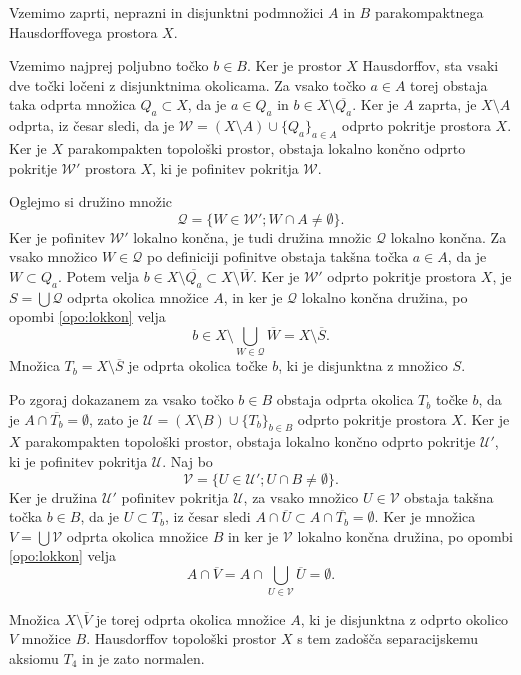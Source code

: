 \documentclass[mat1]{fmfdelo}
\newcommand{\Ucurl}{\mathcal{U}}
\newcommand{\closure}[1]{\overline{#1}}
\begin{document}
\begin{dokaz}
Vzemimo zaprti, neprazni in disjunktni podmnožici $A$ in $B$ parakompaktnega Hausdorff\-o\-ve\-ga prostora $X$.

Vzemimo najprej poljubno točko $b \in B$. Ker je prostor $X$ Hausdorffov, sta vsaki dve točki ločeni z disjunktnima okolicama. Za vsako točko $a \in A$ torej obstaja taka odprta množica $Q_a \subset X$, da je $a \in Q_a$ in $b \in X \setminus \closure{Q_a}$. Ker je $A$ zaprta, je $X \setminus A$ odprta, iz česar sledi, da je $\mathcal{W} = (X \setminus A)\cup \lbrace Q_a\rbrace_{a \in A}$ odprto pokritje prostora $X$. Ker je $X$ parakompakten topološki prostor, obstaja lokalno končno odprto pokritje $\mathcal{W}'$ prostora $X$, ki je pofinitev pokritja $\mathcal{W}$.

Oglejmo si družino množic \[ \mathcal{Q} = \lbrace W \in \mathcal{W}'; W \cap A \neq \emptyset \rbrace. \]
Ker je pofinitev $\mathcal{W}'$ lokalno končna, je tudi družina množic $\mathcal{Q}$ lokalno končna.
Za vsako množico $W \in \mathcal{Q}$ po definiciji pofinitve obstaja takšna točka $a \in A$, da je $W \subset Q_a$.
 Potem velja $b \in X \setminus \closure{Q_a} \subset X \setminus \closure{W}$. Ker je $\mathcal{W}'$ odprto pokritje prostora $X$, je $S = \bigcup\mathcal{Q}$ odprta okolica množice $A$, in ker je $\mathcal{Q}$ lokalno končna družina, po opombi \ref{opo:lokkon} velja \[ b \in X \setminus \bigcup_{W \in \mathcal{Q}} \closure{W} = X \setminus \closure{S}. \] Množica $T_b = X \setminus \closure{S}$ je odprta okolica točke $b$, ki je disjunktna z množico $S$.

Po zgoraj dokazanem za vsako točko $b \in B$ obstaja odprta okolica $T_b$ točke $b$, da je $A \cap \closure{T_b} = \emptyset$, zato je $\Ucurl = (X\setminus B) \cup \lbrace T_b \rbrace_{b \in B}$ odprto pokritje prostora $X$. Ker je $X$ parakompakten topološki prostor, obstaja lokalno končno odprto pokritje $\Ucurl'$, ki je pofinitev pokritja $\Ucurl$. Naj bo \[ \mathcal{V} = \lbrace U \in \Ucurl' ; U \cap B \neq \emptyset \rbrace. \]
Ker je družina $\Ucurl'$ pofinitev pokritja $\Ucurl$, za vsako množico $U \in \mathcal{V}$ obstaja takšna točka $b \in B$, da je $U \subset T_b$, iz česar sledi $A \cap \closure{U} \subset A \cap \closure{T_b} = \emptyset$. Ker je množica $V = \bigcup \mathcal{V}$ odprta okolica množice $B$ in ker je $\mathcal{V}$ lokalno končna družina, po opombi \ref{opo:lokkon} velja \[ A \cap \closure{V} = A \cap \bigcup_{U \in \mathcal{V}}\closure{U} = \emptyset.\]

Množica $X \setminus \closure{V}$ je torej odprta okolica množice $A$, ki je disjunktna z odprto okolico $V$ množice $B$. Hausdorffov topološki prostor $X$ s tem zadošča separacijskemu aksiomu $T_4$ in je zato normalen.
\end{dokaz}
\end{document}

